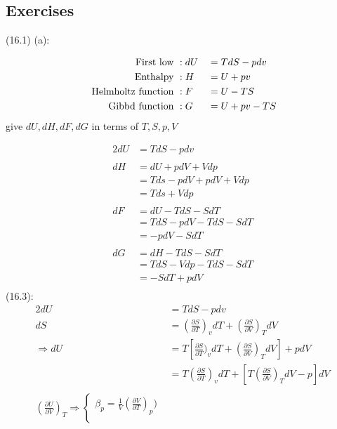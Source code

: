 \begin{latin}   
   \section*{Exercises}
    (16.1) (a):\


    \begin{alignat*}{3}
        \textmd{ First low }&:dU &&= TdS - pdv\\
        \textmd{ Enthalpy }&:H &&= U + pv\\
        \textmd{ Helmholtz function }&:F &&= U - TS\\
        \textmd{ Gibbd function }&:G &&= U + pv - TS
    \end{alignat*}
    give $dU , dH, dF, dG$ in terms of $T, S, p, V$

    \begin{alignat*}{2}
        dU &= TdS - pdv\\\\
        dH &= dU + pdV + Vdp\\
        &= Tds - pdV  + pdV + Vdp\\
        &= Tds + Vdp\\\\
        dF &= dU - TdS - SdT\\
        &=TdS - pdV -TdS - SdT\\
        &= -pdV - SdT\\\\
        dG &= dH - TdS - SdT\\
        &= TdS - Vdp -TdS - SdT \\
        &= -SdT + pdV\\ 
    \end{alignat*}
    (16.3): \\
    \begin{alignat*}{2}
    dU &= TdS - pdv\\
    dS &= (\frac{\partial S}{\partial T})_v dT + (\frac{\partial S}{\partial V})_T dV\\
    \Longrightarrow dU &= T[\frac{\partial S}{\partial T})_v dT + (\frac{\partial S}{\partial V})_T dV] +pdV\\
    &=T(\frac{\partial S}{\partial T})_v dT+ [T(\frac{\partial S}{\partial V})_T dV -p]dV\\\\
    (\frac{\partial U}{\partial V})_T \Rightarrow
    \begin{cases} 
    \beta_p = \frac{1}{V}(\frac{\partial V}{\partial T})_p ) \\

\end{cases}
\end{alignat*}
\end{latin}
